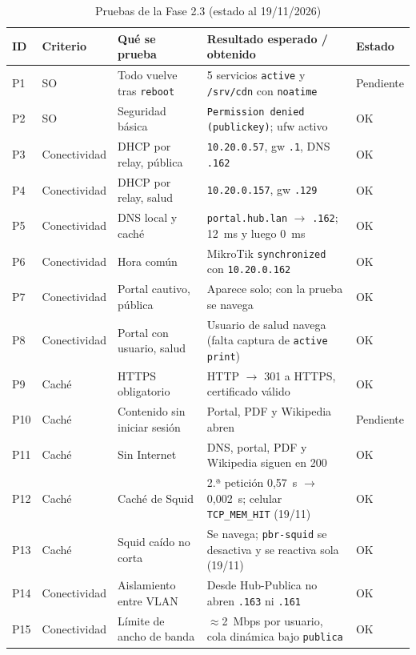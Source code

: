 \documentclass[conference]{IEEEtran}
\begin{document}
\begin{table}[!t]
\centering
\caption{Pruebas de la Fase 2.3 (estado al 19/11/2026)}
\label{tab:pruebas}
\scriptsize
\begin{tabularx}{\textwidth}{llYYl}
\toprule
\textbf{ID} & \textbf{Criterio} & \textbf{Qué se prueba} & \textbf{Resultado esperado / obtenido} & \textbf{Estado} \\
\midrule
P1 & SO & Todo vuelve tras \texttt{reboot} & 5 servicios \texttt{active} y \texttt{/srv/cdn} con \texttt{noatime} & Pendiente \\
P2 & SO & Seguridad básica & \texttt{Permission denied (publickey)}; ufw activo & OK \\
P3 & Conectividad & DHCP por relay, pública & \texttt{10.20.0.57}, gw \texttt{.1}, DNS \texttt{.162} & OK \\
P4 & Conectividad & DHCP por relay, salud & \texttt{10.20.0.157}, gw \texttt{.129} & OK \\
P5 & Conectividad & DNS local y caché & \texttt{portal.hub.lan} $\rightarrow$ \texttt{.162}; 12~ms y luego 0~ms & OK \\
P6 & Conectividad & Hora común & MikroTik \texttt{synchronized} con \texttt{10.20.0.162} & OK \\
P7 & Conectividad & Portal cautivo, pública & Aparece solo; con la prueba se navega & OK \\
P8 & Conectividad & Portal con usuario, salud & Usuario de salud navega (falta captura de \texttt{active print}) & OK \\
P9 & Caché & HTTPS obligatorio & HTTP $\rightarrow$ 301 a HTTPS, certificado válido & OK \\
P10 & Caché & Contenido sin iniciar sesión & Portal, PDF y Wikipedia abren & Pendiente \\
P11 & Caché & Sin Internet & DNS, portal, PDF y Wikipedia siguen en 200 & OK \\
P12 & Caché & Caché de Squid & 2.ª petición 0,57~s $\rightarrow$ 0,002~s; celular \texttt{TCP\_MEM\_HIT} (19/11) & OK \\
P13 & Caché & Squid caído no corta & Se navega; \texttt{pbr-squid} se desactiva y se reactiva sola (19/11) & OK \\
P14 & Conectividad & Aislamiento entre VLAN & Desde Hub-Publica no abren \texttt{.163} ni \texttt{.161} & OK \\
P15 & Conectividad & Límite de ancho de banda & $\approx$2~Mbps por usuario, cola dinámica bajo \texttt{publica} & OK \\
\bottomrule
\end{tabularx}
\end{table}
\end{document}
